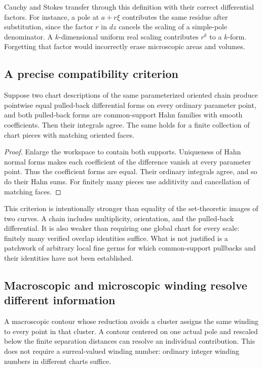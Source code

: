 \documentclass[11pt,letterpaper]{article}
\theoremstyle{definition}
\theoremstyle{remark}
\numberwithin{equation}{section}
\begin{document}
Cauchy and Stokes transfer through this definition with their correct differential factors. For instance, a pole at $a+r\xi$ contributes the same residue after substitution, since the factor $r$ in $dz$ cancels the scaling of a simple-pole denominator. A $k$-dimensional uniform real scaling contributes $r^k$ to a $k$-form. Forgetting that factor would incorrectly erase microscopic areas and volumes.

\subsection{A precise compatibility criterion}
\begin{proposition}\label{prop:overlap}
Suppose two chart descriptions of the same parameterized oriented chain produce pointwise equal pulled-back differential forms on every ordinary parameter point, and both pulled-back forms are common-support Hahn families with smooth coefficients. Then their integrals agree. The same holds for a finite collection of chart pieces with matching oriented faces.
\end{proposition}
\begin{proof}
Enlarge the workspace to contain both supports. Uniqueness of Hahn normal forms makes each coefficient of the difference vanish at every parameter point. Thus the coefficient forms are equal. Their ordinary integrals agree, and so do their Hahn sums. For finitely many pieces use additivity and cancellation of matching faces.
\end{proof}

This criterion is intentionally stronger than equality of the set-theoretic images of two curves. A chain includes multiplicity, orientation, and the pulled-back differential. It is also weaker than requiring one global chart for every scale: finitely many verified overlap identities suffice. What is not justified is a patchwork of arbitrary local fine germs for which common-support pullbacks and their identities have not been established.

\subsection{Macroscopic and microscopic winding resolve different information}
A macroscopic contour whose reduction avoids a cluster assigns the same winding to every point in that cluster. A contour centered on one actual pole and rescaled below the finite separation distances can resolve an individual contribution. This does not require a surreal-valued winding number: ordinary integer winding numbers in different charts suffice.
\end{document}
